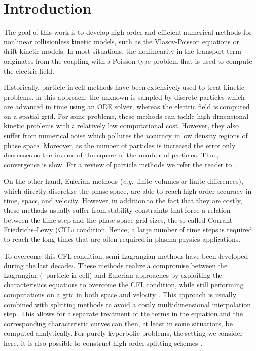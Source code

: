 
\section{Introduction}
\label{chap1:intro}



The goal of this work is to develop high order and efficient numerical methods for nonlinear collisionless kinetic models, such as the Vlasov-Poisson equations or drift-kinetic models. In most situations, the nonlinearity in the transport term originates from the coupling with a Poisson type problem that is used to compute the electric field.  

Historically, particle in cell methods have been extensively used to treat kinetic problems. In this approach, the unknown is sampled by discrete particles which are advanced in time using an ODE solver, whereas the electric field is computed on a spatial grid. For some problems, these methods can tackle high dimensional kinetic problems with a relatively low computational cost. However, they also suffer from numerical noise which pollutes the accuracy in low density regions of phase space. Moreover, as the number of particles is increased the error only decreases as the inverse of the square of the number of particles. Thus, convergence is slow. For a review of particle methods we refer the reader to \cite{Verboncoeur:2005}.

On the other hand, Eulerian methods ({\it e.g.}~finite volumes or finite differences), which directly discretize the phase space, are able to reach high order accuracy in time, space, and velocity.  However, in addition to the fact that they are costly, these methods usually suffer from stability constraints that force a relation between the time step and the phase space grid sizes, the so-called Courant--Friedrichs--Lewy (CFL) condition. Hence, a large number of time steps is required to reach the long times that are often required in plasma physics applications. 

To overcome this CFL condition, semi-Lagrangian methods have been developed during the last decades. These methods realize a compromise between the Lagrangian (\ie~particle in cell) and Eulerian approaches by exploiting the characteristics equations to overcome the CFL condition, while still performing computations on a grid in both space and velocity \cite{Cheng:1976,Sonnendrucker:1999,Filbet:2003}. This approach is usually combined with splitting methods to avoid a costly multidimensional interpolation step. This allows for a separate treatment of the terms in the equation and the corresponding characteristic curves can then, at least in some situations, be computed analytically. For purely hyperbolic problems, the setting we consider here, it is also possible to construct high order splitting schemes \cite{Casas:2017}.


